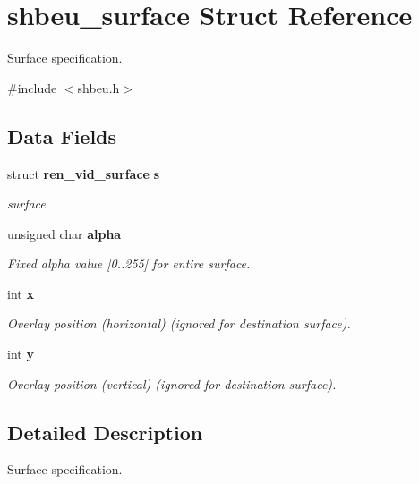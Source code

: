 \section{shbeu\_\-surface Struct Reference}
\label{structshbeu__surface}


Surface specification.  




{\ttfamily \#include $<$shbeu.h$>$}

\subsection*{Data Fields}
\begin{DoxyCompactItemize}
\item 
struct {\bf ren\_\-vid\_\-surface} {\bf s}\label{structshbeu__surface_aac957b73bdb1d850baece28c8d802cdf}

\begin{DoxyCompactList}\small\item\em surface \item\end{DoxyCompactList}\item 
unsigned char {\bf alpha}
\begin{DoxyCompactList}\small\item\em Fixed alpha value [0..255] for entire surface. \item\end{DoxyCompactList}\item 
int {\bf x}\label{structshbeu__surface_a4af36810558f3286c8944030406c1b62}

\begin{DoxyCompactList}\small\item\em Overlay position (horizontal) (ignored for destination surface). \item\end{DoxyCompactList}\item 
int {\bf y}\label{structshbeu__surface_a722f413bbfaee829d7cccf84e5926d15}

\begin{DoxyCompactList}\small\item\em Overlay position (vertical) (ignored for destination surface). \item\end{DoxyCompactList}\end{DoxyCompactItemize}


\subsection{Detailed Description}
Surface specification. 

